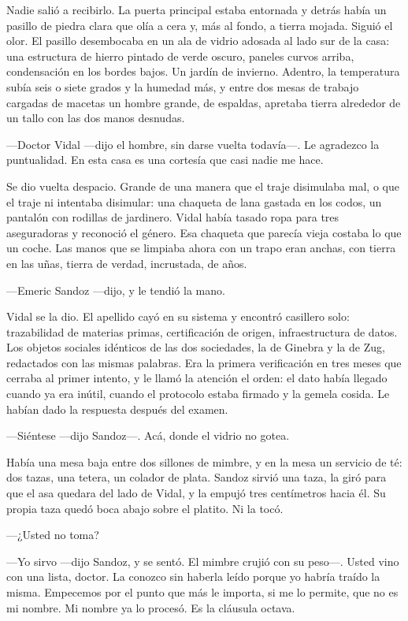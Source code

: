 Nadie salió a recibirlo. La puerta principal estaba entornada y detrás había un pasillo de piedra clara que olía a cera y, más al fondo, a tierra mojada. Siguió el olor. El pasillo desembocaba en un ala de vidrio adosada al lado sur de la casa: una estructura de hierro pintado de verde oscuro, paneles curvos arriba, condensación en los bordes bajos. Un jardín de invierno. Adentro, la temperatura subía seis o siete grados y la humedad más, y entre dos mesas de trabajo cargadas de macetas un hombre grande, de espaldas, apretaba tierra alrededor de un tallo con las dos manos desnudas.

---Doctor Vidal ---dijo el hombre, sin darse vuelta todavía---. Le agradezco la puntualidad. En esta casa es una cortesía que casi nadie me hace.

Se dio vuelta despacio. Grande de una manera que el traje disimulaba mal, o que el traje ni intentaba disimular: una chaqueta de lana gastada en los codos, un pantalón con rodillas de jardinero. Vidal había tasado ropa para tres aseguradoras y reconoció el género. Esa chaqueta que parecía vieja costaba lo que un coche. Las manos que se limpiaba ahora con un trapo eran anchas, con tierra en las uñas, tierra de verdad, incrustada, de años.

---Emeric Sandoz ---dijo, y le tendió la mano.

Vidal se la dio. El apellido cayó en su sistema y encontró casillero solo: trazabilidad de materias primas, certificación de origen, infraestructura de datos. Los objetos sociales idénticos de las dos sociedades, la de Ginebra y la de Zug, redactados con las mismas palabras. Era la primera verificación en tres meses que cerraba al primer intento, y le llamó la atención el orden: el dato había llegado cuando ya era inútil, cuando el protocolo estaba firmado y la gemela cosida. Le habían dado la respuesta después del examen.

---Siéntese ---dijo Sandoz---. Acá, donde el vidrio no gotea.

Había una mesa baja entre dos sillones de mimbre, y en la mesa un servicio de té: dos tazas, una tetera, un colador de plata. Sandoz sirvió una taza, la giró para que el asa quedara del lado de Vidal, y la empujó tres centímetros hacia él. Su propia taza quedó boca abajo sobre el platito. Ni la tocó.

---¿Usted no toma?

---Yo sirvo ---dijo Sandoz, y se sentó. El mimbre crujió con su peso---. Usted vino con una lista, doctor. La conozco sin haberla leído porque yo habría traído la misma. Empecemos por el punto que más le importa, si me lo permite, que no es mi nombre. Mi nombre ya lo procesó. Es la cláusula octava.


